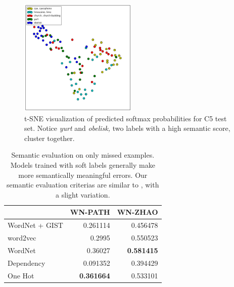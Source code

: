 


\begin{figure}[!tb]
  \centering
  \includegraphics[width=0.5\textwidth]{figs/tsne.png}
  \caption{
      t-SNE visualization of predicted softmax probabilities for C5 test set.
      Notice \emph{yurt} and \emph{obelisk,} two labels with a high semantic
      score, cluster together.
  }
  \label{fig:tsne}
\end{figure}

\begin{table}[!tb]
    \centering
    \begin{tabular}{lrr}
         & WN-PATH & WN-ZHAO\\
        \hline
        WordNet + GIST & 0.261114 & 0.456478\\
        word2vec & 0.2995 & 0.550523\\
        WordNet & 0.36027 & \textbf{0.581415}\\
        Dependency & 0.091352 & 0.394429\\
        One Hot & \textbf{0.361664} & 0.533101\\
    \end{tabular}
  \label{tbl:semantic_misses}
  \caption{
      Semantic evaluation on only missed examples. Models trained
      with soft labels generally make more semantically meaningful errors. Our
      semantic evaluation criterias are similar to \cite{zhao2011large}, with a
      slight variation.
  }
\end{table}

